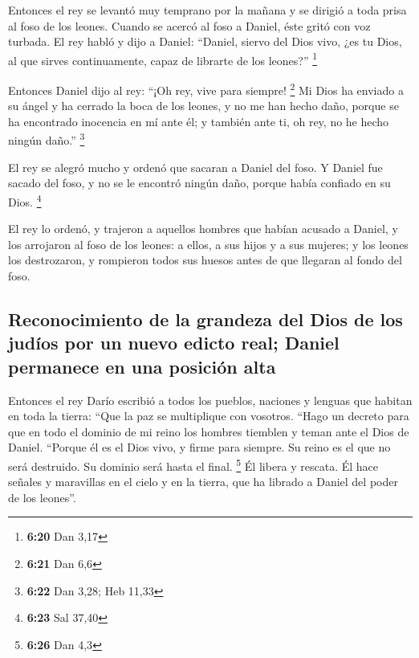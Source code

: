 \begin{paracol}{2}
 Entonces el rey se levantó muy temprano por la mañana y
se dirigió a toda prisa al foso de los leones.  Cuando se
acercó al foso a Daniel, éste gritó con voz turbada. El rey habló y dijo
a Daniel: ``Daniel, siervo del Dios vivo, ¿es tu Dios, al que sirves
continuamente, capaz de librarte de los leones?'' \footnote{\textbf{6:20}
  Dan 3,17}

 Entonces Daniel dijo al rey: ``¡Oh rey, vive para
siempre! \footnote{\textbf{6:21} Dan 6,6}  Mi Dios ha
enviado a su ángel y ha cerrado la boca de los leones, y no me han hecho
daño, porque se ha encontrado inocencia en mí ante él; y también ante
ti, oh rey, no he hecho ningún daño.'' \footnote{\textbf{6:22} Dan 3,28;
  Heb 11,33}

 El rey se alegró mucho y ordenó que sacaran a Daniel del
foso. Y Daniel fue sacado del foso, y no se le encontró ningún daño,
porque había confiado en su Dios. \footnote{\textbf{6:23} Sal 37,40}

 El rey lo ordenó, y trajeron a aquellos hombres que
habían acusado a Daniel, y los arrojaron al foso de los leones: a ellos,
a sus hijos y a sus mujeres; y los leones los destrozaron, y rompieron
todos sus huesos antes de que llegaran al fondo del foso.

\hypertarget{reconocimiento-de-la-grandeza-del-dios-de-los-juduxedos-por-un-nuevo-edicto-real-daniel-permanece-en-una-posiciuxf3n-alta}{%
\subsection{Reconocimiento de la grandeza del Dios de los judíos por un
nuevo edicto real; Daniel permanece en una posición
alta}\label{reconocimiento-de-la-grandeza-del-dios-de-los-juduxedos-por-un-nuevo-edicto-real-daniel-permanece-en-una-posiciuxf3n-alta}}

 Entonces el rey Darío escribió a todos los pueblos,
naciones y lenguas que habitan en toda la tierra: ``Que la paz se
multiplique con vosotros.  ``Hago un decreto para que en
todo el dominio de mi reino los hombres tiemblen y teman ante el Dios de
Daniel. ``Porque él es el Dios vivo, y firme para siempre. Su reino es
el que no será destruido. Su dominio será hasta el final. \footnote{\textbf{6:26}
  Dan 4,3}  Él libera y rescata. Él hace señales y
maravillas en el cielo y en la tierra, que ha librado a Daniel del poder
de los leones''.


\end{paracol}
